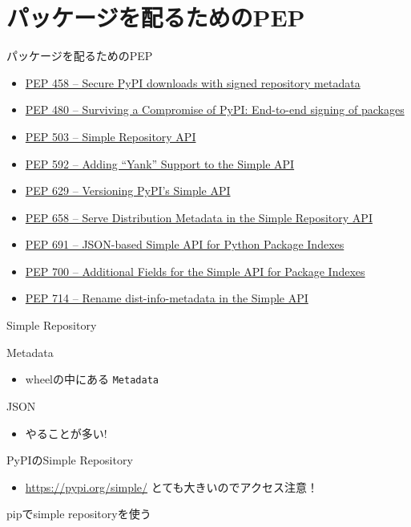 \documentclass[presentation]{beamer}
\begin{document}
\section{パッケージを配るためのPEP}
\label{sec:orgfec5d98}
\begin{frame}[label={sec:org9298f5d}]{パッケージを配るためのPEP}
\begin{itemize}
\item \href{https://peps.python.org/pep-0458}{PEP 458 – Secure PyPI downloads with signed repository metadata}
\item \href{https://peps.python.org/pep-0480}{PEP 480 – Surviving a Compromise of PyPI: End-to-end signing of packages}
\item \href{https://peps.python.org/pep-0503/}{PEP 503 – Simple Repository API}
\item \href{https://peps.python.org/pep-0592}{PEP 592 – Adding “Yank” Support to the Simple API}
\item \href{https://peps.python.org/pep-0629}{PEP 629 – Versioning PyPI’s Simple API}
\item \href{https://peps.python.org/pep-0658}{PEP 658 – Serve Distribution Metadata in the Simple Repository API}
\item \href{https://peps.python.org/pep-0691}{PEP 691 – JSON-based Simple API for Python Package Indexes}
\item \href{https://peps.python.org/pep-0700}{PEP 700 – Additional Fields for the Simple API for Package Indexes}
\item \href{https://peps.python.org/pep-0714}{PEP 714 – Rename dist-info-metadata in the Simple API}
\end{itemize}
\end{frame}
\begin{frame}[label={sec:org78be1f3}]{Simple Repository}
\end{frame}
\begin{frame}[label={sec:org0c5fd5e},fragile]{Metadata}
 \begin{itemize}
\item wheelの中にある \texttt{Metadata}
\end{itemize}
\end{frame}
\begin{frame}[label={sec:org92c539f}]{JSON}
\begin{itemize}
\item やることが多い!
\end{itemize}
\end{frame}
\begin{frame}[label={sec:org02ee95c}]{PyPIのSimple Repository}
\begin{itemize}
\item \url{https://pypi.org/simple/} とても大きいのでアクセス注意！
\end{itemize}
\end{frame}
\begin{frame}[label={sec:org7625a11}]{pipでsimple repositoryを使う}
\end{frame}
\end{document}
